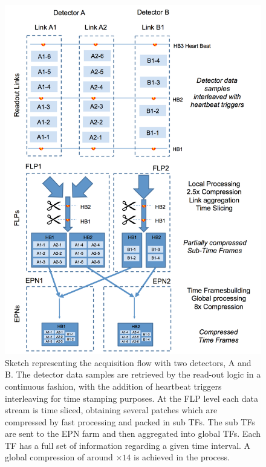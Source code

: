 \begin{figure}[!]
\begin{center}
\includegraphics[width=0.9\linewidth]{Chapters/O2/Figs/TF.pdf}
\caption{Sketch representing the acquisition flow with two detectors, A and B. The detector data samples are retrieved by the read-out logic in a continuous fashion, with the addition of heartbeat triggers interleaving for time stamping purposes. At the FLP level each data stream is time sliced, obtaining several patches which are compressed by fast processing and packed in sub TFs. The sub TFs are sent to the EPN farm and then aggregated into global TFs. Each TF has a full set of information regarding a given time interval. A global compression of around $\times14$ is achieved in the process.}
\label{fig:O2_TF}
\end{center}
\end{figure}

